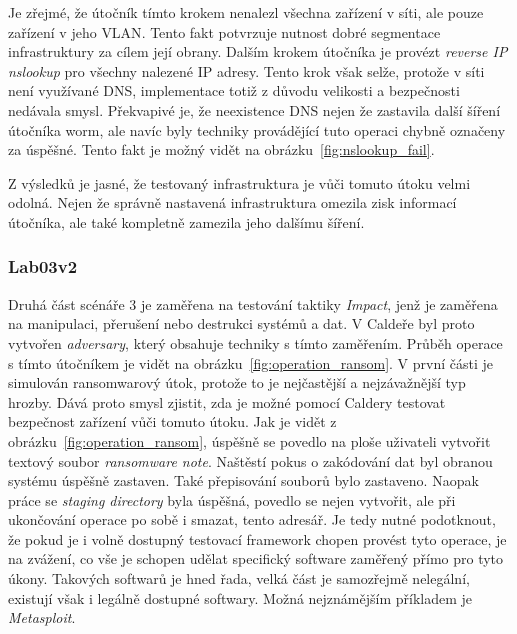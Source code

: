 
Je zřejmé, že útočník tímto krokem nenalezl všechna zařízení v síti, ale pouze zařízení v jeho \ac{VLAN}.
Tento fakt potvrzuje nutnost dobré segmentace infrastruktury za cílem její obrany.
Dalším krokem útočníka je provézt \textit{reverse IP nslookup} pro všechny nalezené IP adresy.
Tento krok však selže, protože v síti není využívané \ac{DNS}, implementace totiž z důvodu velikosti a bezpečnosti nedávala smysl.
Překvapivé je, že neexistence \ac{DNS} nejen že zastavila další šíření útočníka worm, ale navíc byly techniky provádějící tuto operaci chybně označeny za úspěšné.
Tento fakt je možný vidět na obrázku~\ref{fig:nslookup_fail}.

Z výsledků je jasné, že testovaný infrastruktura je vůči tomuto útoku velmi odolná.
Nejen že správně nastavená infrastruktura omezila zisk informací útočníka, ale také kompletně zamezila jeho dalšímu šíření.

\subsubsection{Lab03v2}
Druhá část scénáře 3 je zaměřena na testování taktiky \textit{Impact}, jenž je zaměřena na manipulaci, přerušení nebo destrukci systémů a dat.
V Caldeře byl proto vytvořen \textit{adversary}, který obsahuje techniky s tímto zaměřením.
Průběh operace s tímto útočníkem je vidět na obrázku~\ref{fig:operation_ransom}.
V první části je simulován ransomwarový útok, protože to je nejčastější a nejzávažnější typ hrozby.
Dává proto smysl zjistit, zda je možné pomocí Caldery testovat bezpečnost zařízení vůči tomuto útoku.
Jak je vidět z obrázku~\ref{fig:operation_ransom}, úspěšně se povedlo na ploše uživateli vytvořit textový soubor \textit{ransomware note}.
Naštěstí pokus o zakódování dat byl obranou systému úspěšně zastaven.
Také přepisování souborů bylo zastaveno.
Naopak práce se \textit{staging directory} byla úspěšná, povedlo se nejen vytvořit, ale při ukončování operace po sobě i smazat, tento adresář.
Je tedy nutné podotknout, že pokud je i volně dostupný testovací framework chopen provést tyto operace, je na zvážení, co vše je schopen udělat specifický software zaměřený přímo pro tyto úkony.
Takových softwarů je hned řada, velká část je samozřejmě nelegální, existují však i legálně dostupné softwary.
Možná nejznámějším příkladem je \textit{Metasploit}\cite{metasploit}.

